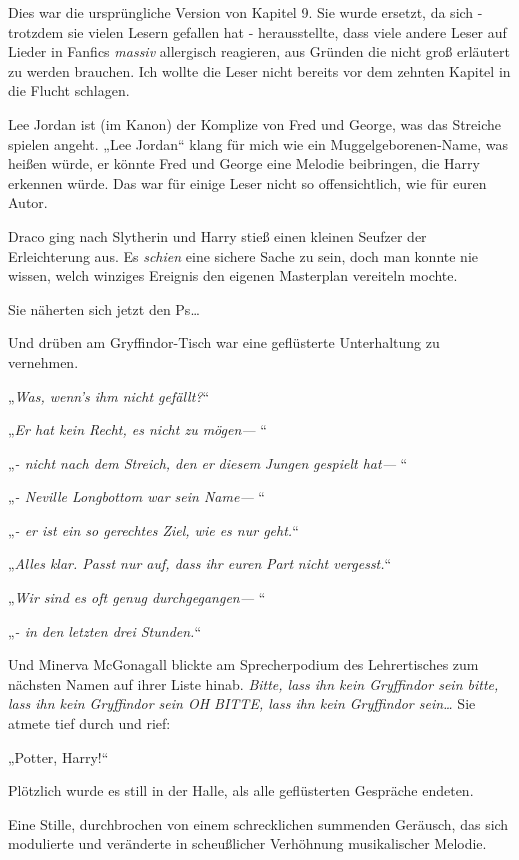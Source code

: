 {Dies war die ursprüngliche Version von Kapitel 9. Sie wurde ersetzt, da sich - trotzdem sie vielen Lesern gefallen hat - herausstellte, dass viele andere Leser auf Lieder in Fanfics \emph{massiv} allergisch reagieren, aus Gründen die nicht groß erläutert zu werden brauchen. Ich wollte die Leser nicht bereits vor dem zehnten Kapitel in die Flucht schlagen.

Lee Jordan ist (im Kanon) der Komplize von Fred und George, was das Streiche spielen angeht. „Lee Jordan“ klang für mich wie ein Muggelgeborenen-Name, was heißen würde, er könnte Fred und George eine Melodie beibringen, die Harry erkennen würde. Das war für einige Leser nicht so offensichtlich, wie für euren Autor.

\later

Draco ging nach Slytherin und Harry stieß einen kleinen Seufzer der Erleichterung aus. Es \emph{schien} eine sichere Sache zu sein, doch man konnte nie wissen, welch winziges Ereignis den eigenen Masterplan vereiteln mochte.

Sie näherten sich jetzt den Ps…

Und drüben am Gryffindor-Tisch war eine geflüsterte Unterhaltung zu vernehmen.

„\emph{Was, wenn's ihm nicht gefällt?}“

„\emph{Er hat kein Recht, es nicht zu mögen—} “

„\emph{- nicht nach dem Streich, den er} \emph{diesem} \emph{Jungen} \emph{gespielt hat—} “

„\emph{- Neville Longbottom war sein Name—} “

„\emph{- er ist ein so gerechtes Ziel, wie es nur geht.}“

„\emph{Alles klar. Passt nur auf, dass ihr euren} \emph{Part} \emph{nicht vergesst.}“

„\emph{Wir sind es oft genug durchgegangen—} “

„\emph{- in den letzten drei Stunden.}“

Und Minerva McGonagall blickte am Sprecherpodium des Lehrertisches zum nächsten Namen auf ihrer Liste hinab. \emph{Bitte, lass ihn kein Gryffindor sein bitte, lass ihn kein Gryffindor sein OH BITTE, lass ihn kein Gryffindor sein…} Sie atmete tief durch und rief:

„Potter, Harry!“

Plötzlich wurde es still in der Halle, als alle geflüsterten Gespräche endeten.

Eine Stille, durchbrochen von einem schrecklichen summenden Geräusch, das sich modulierte und veränderte in scheußlicher Verhöhnung musikalischer Melodie.

}
